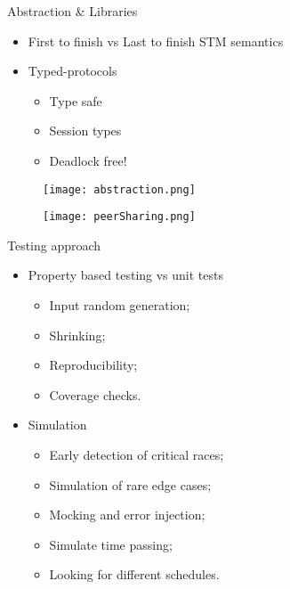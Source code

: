 \documentclass{beamer}
\begin{document}
\begin{frame}{Abstraction \& Libraries}
  \begin{minipage}{0.6\textwidth} %
    \begin{itemize}
      \item First to finish vs Last to finish STM semantics
      \item Typed-protocols
         \begin{itemize}
           \item Type safe
           \item Session types
           \item \alert{Deadlock free!}
         \end{itemize}
    \end{itemize}
  \end{minipage}%
  \begin{minipage}{0.4\textwidth} %
    \begin{figure}[h]
      \texttt{[image: abstraction.png]} %
    \end{figure}
    \begin{figure}[h]
      \texttt{[image: peerSharing.png]} %
    \end{figure}
  \end{minipage}
\end{frame}

\begin{frame}{Testing approach}
  \begin{itemize}
    \item Property based testing vs unit tests
       \begin{itemize}
         \item \alert{Input random generation};
         \item Shrinking;
         \item \alert{Reproducibility};
         \item Coverage checks.
       \end{itemize}
    \item Simulation
       \begin{itemize}
         \item Early detection of critical races;
         \item Simulation of rare \alert{edge cases};
         \item Mocking and \alert{error injection};
         \item Simulate time passing;
         \item Looking for \alert{different schedules}.
       \end{itemize}
  \end{itemize}
\end{frame}
\end{document}
